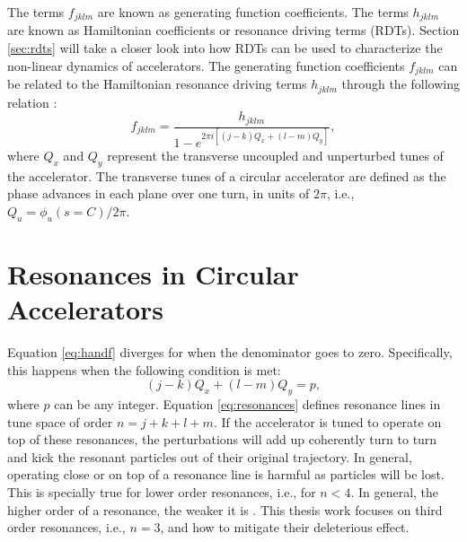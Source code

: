 The terms $f_{jklm}$ are known as generating function coefficients. The terms $h_{jklm}$ are known as Hamiltonian coefficients or resonance driving terms (RDTs). Section \ref{sec:rdts} will take a closer look into how RDTs can be used to characterize the non-linear dynamics of accelerators. The generating function coefficients $f_{jklm}$ can be related to the Hamiltonian resonance driving terms $h_{jklm}$ through the following relation \cite{cernthesis1,bartolini}:
\begin{equation}
    \label{eq:handf}
    f_{jklm}=\frac{h_{jklm}}{1-e^{2\pi i \left[ \left( j-k \right) Q_x + \left( l-m\right) Q_y \right] }},
\end{equation}
where $Q_x$ and $Q_y$ represent the transverse uncoupled and unperturbed tunes of the accelerator. The transverse tunes of a circular accelerator are defined as the phase advances in each plane over one turn, in units of $2\pi$, i.e., $Q_u=\phi_u(s=C)/2\pi$. 

\section{Resonances in Circular Accelerators}

Equation \ref{eq:handf} diverges for when the denominator goes to zero. Specifically, this happens when the following condition is met:
\begin{equation}
    \label{eq:resonances}
    \left( j-k \right) Q_x + \left( l-m\right) Q_y = p,
\end{equation}
where $p$ can be any integer. Equation \ref{eq:resonances} defines resonance lines in tune space of order $n=j+k+l+m$. If the accelerator is tuned to operate on top of these resonances, the perturbations will add up coherently turn to turn and kick the resonant particles out of their original trajectory. In general, operating close or on top of a resonance line is harmful as particles will be lost. This is specially true for lower order resonances, i.e., for $n<4$. In general, the higher order of a resonance, the weaker it is \cite{Wiedemann2015}. This thesis work focuses on third order resonances, i.e., $n=3$, and how to mitigate their deleterious effect. 

